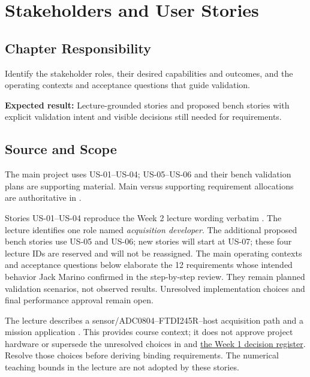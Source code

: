 \chapter{Stakeholders and User Stories}

\section{Chapter Responsibility}
\label{Section:UserStoriesResponsibility}
Identify the stakeholder roles, their desired capabilities and outcomes, and
the operating contexts and acceptance questions that guide validation.

\noindent\textbf{Expected result:} Lecture-grounded stories and proposed bench stories with explicit
validation intent and visible decisions still needed for requirements.

\section{Source and Scope}
The main project uses US-01--US-04; US-05--US-06 and their bench validation plans are supporting material. Main versus supporting requirement allocations are authoritative in .

\label{Section:WeekTwoStoryScope}
Stories US-01--US-04 reproduce the Week 2 lecture wording verbatim
\cite[slides 19--20]{SPE800Week02}. The lecture identifies one role named
\emph{acquisition developer}. The additional proposed bench stories use US-05 and US-06; new stories will start at US-07;
these four lecture IDs are reserved and will not be reassigned.
The main operating contexts and acceptance questions below elaborate the 12 requirements whose intended behavior Jack Marino confirmed in the step-by-step review. They remain planned validation scenarios, not observed results. Unresolved implementation choices and final performance approval remain open.

The lecture describes a sensor/ADC0804--FTDI245R--host acquisition path and
a mission application \cite[slides 12--15]{SPE800Week02}. This provides course
context; it does not approve project hardware or supersede the unresolved
choices in  and
\hyperref[Table:WeekOneTBDs]{the Week 1 decision register}. Resolve those
choices before deriving binding requirements. The numerical teaching bounds
in the lecture are not adopted by these stories.

